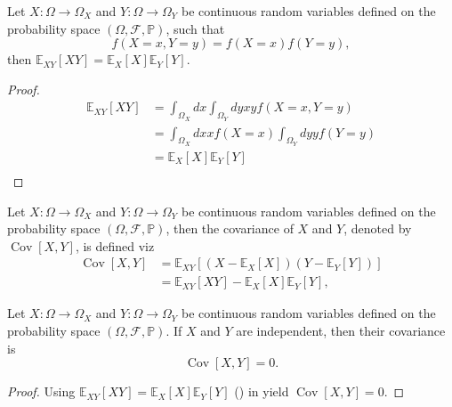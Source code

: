 \begin{theorem}
	\label{theorem:expectation_independent}
	Let $X: \Omega \to \Omega_X$ and $Y: \Omega \to \Omega_Y$ be continuous random variables defined on the probability space $(\Omega, \mathcal{F}, \mathbb{P})$, such that
	\begin{equation}
	f(X=x,Y=y)=f(X=x)f(Y=y),	
	\end{equation}
	then $\mathbb{E}_{XY}[XY]=\mathbb{E}_X[X]\mathbb{E}_Y[Y]$.
\end{theorem}

\begin{proof}
	\begin{equation}
		\begin{split}
			\mathbb{E}_{XY}[XY] &= \int_{\Omega_X}dx\int_{\Omega_Y}dy x y f(X=x,Y=y)\\
			&= \int_{\Omega_X}dx x f(X=x)\int_{\Omega_Y}dy yf(Y=y)\\
			&= \mathbb{E}_X[X]\mathbb{E}_Y[Y]\\
		\end{split}
	\end{equation}
\end{proof}

\begin{definition}[Covariance]
	\label{def:covariance}
	Let $X: \Omega \to \Omega_X$ and $Y: \Omega \to \Omega_Y$ be continuous random variables defined on the probability space $(\Omega, \mathcal{F}, \mathbb{P})$, then the covariance of $X$ and $Y$, denoted by $\operatorname{Cov}[X,Y]$, is defined viz
	\begin{equation}
		\begin{split}
			\operatorname{Cov}[X,Y]&=\mathbb{E}_{XY}[(X-\mathbb{E}_X[X])(Y-\mathbb{E}_Y[Y])]\\
			&=\mathbb{E}_{XY}[XY]-\mathbb{E}_X[X]\mathbb{E}_Y[Y],
		\end{split}
	\end{equation}
\end{definition}
\begin{theorem}
	\label{theorem:covariance_of_independent_variables}
	Let $X: \Omega \to \Omega_X$ and $Y: \Omega \to \Omega_Y$ be continuous random variables defined on the probability space $(\Omega, \mathcal{F}, \mathbb{P})$. If $X$ and $Y$ are independent, then their covariance is
	\begin{equation}
		\operatorname{Cov}[X,Y] = 0.
	\end{equation}
	
\end{theorem}
\begin{proof}
	Using $\mathbb{E}_{XY}[XY]=\mathbb{E}_X[X]\mathbb{E}_Y[Y]$ () in  yield $\operatorname{Cov}[X,Y]=0$.
\end{proof}

